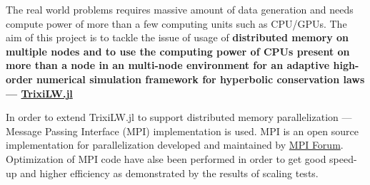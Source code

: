 The real world problems requires massive amount of data generation and needs compute power of more than a few computing units such as CPU/GPUs. The aim of this project is to tackle the issue of usage of \textbf{distributed memory on multiple nodes and to use the computing power of CPUs present on more than a node in an multi-node environment for an adaptive high-order numerical simulation framework for hyperbolic conservation laws --- \href{https://www.example.com}{\ttfamily TrixiLW.jl}} \vspace{15pt}

In order to extend {\ttfamily TrixiLW.jl} to support distributed memory parallelization --- Message Passing Interface (MPI) implementation is used. MPI is an open source implementation for parallelization developed and maintained by \href{https://www.mpi-forum.org/}{MPI Forum}. Optimization of MPI code have alse been performed in order to get good speed-up and higher efficiency as demonstrated by the results of scaling tests.
